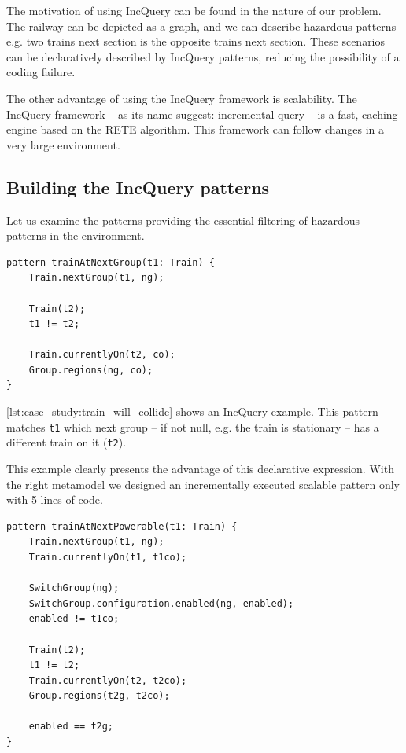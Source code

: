 \begin{samepage}
The motivation of using IncQuery can be found in the nature of our problem. The railway can be depicted as a graph, and we can describe hazardous patterns e.g. two trains next section is the opposite trains next section. These scenarios can be declaratively described by IncQuery patterns, reducing the possibility of a coding failure. 

The other advantage of using the IncQuery framework is scalability. The IncQuery framework -- as its name suggest: incremental query -- is a fast, caching engine based on the RETE algorithm. This framework can follow changes in a very large environment. 
\end{samepage}

\subsection{Building the IncQuery patterns}
\label{sec:case_study:pattern_building}

Let us examine the patterns providing the essential filtering of hazardous patterns in the environment.
\\[1ex]

\begin{lstlisting}[caption={Collision detection},label=lst:case_study:train_will_collide]
pattern trainAtNextGroup(t1: Train) {
	Train.nextGroup(t1, ng);
	
	Train(t2);
	t1 != t2;
	
	Train.currentlyOn(t2, co);
	Group.regions(ng, co);
}
\end{lstlisting}

\cref{lst:case_study:train_will_collide} shows an IncQuery example. This pattern matches \verb+t1+ which next group -- if not null, e.g. the train is stationary -- has a different train on it (\verb+t2+).

This example clearly presents the advantage of this declarative expression. With the right metamodel we designed an incrementally executed scalable pattern only with 5 lines of code.
\\[1ex]

\begin{lstlisting}[caption={Collision detection},label=lst:case_study:train_at_next_powerable]
pattern trainAtNextPowerable(t1: Train) {
	Train.nextGroup(t1, ng);
	Train.currentlyOn(t1, t1co);
	
	SwitchGroup(ng);
	SwitchGroup.configuration.enabled(ng, enabled);
	enabled != t1co;
	
	Train(t2);
	t1 != t2;
	Train.currentlyOn(t2, t2co);
	Group.regions(t2g, t2co);
	
	enabled == t2g;
}
\end{lstlisting}

